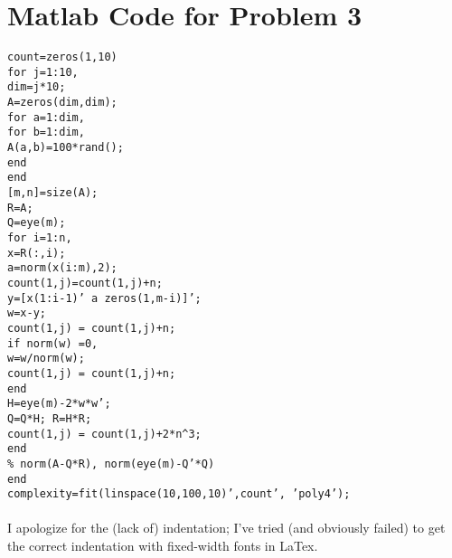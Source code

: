 \documentclass[11pt]{article}
\begin{document}
\section{Matlab Code for Problem 3}
\texttt
{count=zeros(1,10)\\
for j=1:10,\\
	 dim=j*10;\\
     A=zeros(dim,dim);\\
     for a=1:dim,\\
         for b=1:dim,\\
             A(a,b)=100*rand();\\
         end\\
     end\\}
     \texttt{[m,n}\texttt{]=size(A);\\
     R=A;\\
     Q=eye(m);\\
     for i=1:n,\\
        x=R(:,i);\\
        a=norm(x(i:m),2);\\
        count(1,j)=count(1,j)+n;\\
        y=[x(1:i-1)' a zeros(1,m-i)]';\\
        w=x-y;\\
        count(1,j) = count(1,j)+n;\\
        if norm(w)~=0,\\
           w=w/norm(w);\\
         count(1,j) = count(1,j)+n;\\
        end\\
        H=eye(m)-2*w*w';\\
        Q=Q*H; R=H*R;\\
        count(1,j) = count(1,j)+2*n\^{}3;\\
     end\\
     \% norm(A-Q*R), norm(eye(m)-Q'*Q)\\
 end\\
 complexity=fit(linspace(10,100,10)',count', 'poly4');\\}\\
I apologize for the (lack of) indentation; I've tried (and obviously failed) to get the correct indentation with fixed-width fonts in  LaTex.
\end{document}
